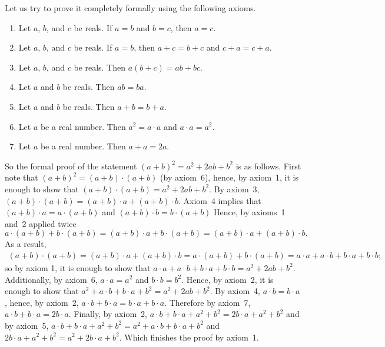 Let us try to prove it completely formally using the following axioms.
\begin{enumerate}
  \item Let $a$, $b$, and $c$ be reals. If $a = b$ and $b = c$, then $a = c$.
  \item Let $a$, $b$, and $c$ be reals. If $a = b$, then $a + c = b + c$ and
    $c + a = c + a$.
  \item Let $a$, $b$, and $c$ be reals. Then $a (b + c) = ab + bc$.
  \item Let $a$ and $b$ be reals. Then $ab = ba$.
  \item Let $a$ and $b$ be reals. Then $a + b = b + a$.
  \item Let $a$ be a real number. Then $a^2 = a \cdot a$ and $a \cdot a = a^2$.
  \item Let $a$ be a real number. Then $a + a = 2a$.
\end{enumerate}
So the formal proof of the statement $(a + b)^2 = a^2 + 2ab + b^2$ is as
follows. First note that $(a + b)^2 = (a + b) \cdot (a + b)$ (by axiom~6),
hence, by axiom~1, it is enough to show that
$(a + b) \cdot (a + b) = a^2 + 2ab + b^2$. By axiom~3,
$(a + b) \cdot (a + b) = (a + b) \cdot a + (a + b) \cdot b$. Axiom~4 implies
that $(a + b) \cdot a = a \cdot (a + b)$ and $(a + b) \cdot b = b \cdot (a + b)$
Hence, by axioms~1 and~2 applied twice
\[
  a \cdot (a + b) + b \cdot (a + b) =
  (a + b) \cdot a + b \cdot (a + b) =
  (a + b) \cdot a + (a + b) \cdot b.
\]
As a result,
\begin{multline*}
  (a + b) \cdot (a + b) =
  (a + b) \cdot a + (a + b) \cdot b =
  a \cdot (a + b) + b \cdot (a + b) =
  a \cdot a + a \cdot b + b \cdot a + b \cdot b;
\end{multline*}
so by axiom 1, it is enough
to show that $a \cdot a + a \cdot b + b \cdot a + b \cdot b = a^2 + 2ab + b^2$.
Additionally, by axiom~6, $a \cdot a = a^2$ and $b \cdot b = b^2$. Hence, by
axiom~2, it is enough to show that
$a^2 + a \cdot b + b \cdot a + b^2 = a^2 + 2ab + b^2$. By axiom~4,
$a \cdot b = b \cdot a$, hence, by axiom~2,
$a \cdot b + b \cdot a = b \cdot a + b \cdot a$. Therefore by axiom~7,
$a \cdot b + b \cdot a = 2 b \cdot a$. Finally, by axiom~2,
$a \cdot b + b \cdot a + a^2 + b^2 = 2b \cdot a + a^2 + b^2$ and by axiom~5,
$a \cdot b + b \cdot a + a^2 + b^2 = a^2 + a \cdot b + b \cdot a + b^2$ and
$2b \cdot a + a^2 + b^2 =  a^2 + 2b \cdot a + b^2$. Which finishes the proof by
axiom~1.

